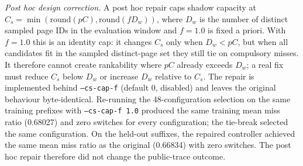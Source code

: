 \documentclass[journal,onecolumn]{IEEEtran}
\begin{document}
\emph{Post hoc design correction.} A post hoc repair caps shadow capacity at
$C_s=\min(\mathrm{round}(pC),\mathrm{round}(f D_w))$, where $D_w$ is the
number of distinct sampled page IDs in the evaluation window and $f=1.0$ is
fixed a priori. With $f=1.0$ this is an identity cap: it changes $C_s$ only
when $D_w < pC$, but when all candidates fit in the sampled distinct-page
set they still tie on compulsory misses. It therefore cannot create
rankability where $pC$ already exceeds $D_w$; a real fix must reduce $C_s$
below $D_w$ or increase $D_w$ relative to $C_s$. The repair is implemented
behind \texttt{--cs-cap-f} (default 0, disabled) and leaves the original
behaviour byte-identical. Re-running the 48-configuration selection on the
same training prefixes with \texttt{--cs-cap-f 1.0} produced the same training
mean miss ratio (0.68027) and zero switches for every configuration; the
tie-break selected the same configuration. On the held-out suffixes, the
repaired controller achieved the same mean miss ratio as the original
(0.66834) with zero switches. The post hoc repair therefore did not change
the public-trace outcome.
\end{document}
